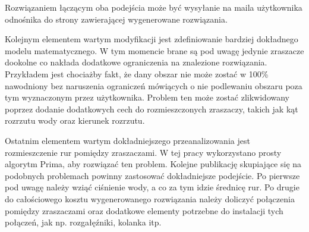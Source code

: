 \documentclass[twoside]{iisthesis}
\begin{document}
Rozwiązaniem łączącym oba podejścia może być wysyłanie na maila użytkownika odnośnika do strony zawierającej wygenerowane rozwiązania.

Kolejnym elementem wartym modyfikacji jest zdefiniowanie bardziej dokładnego modelu matematycznego. W tym momencie brane są pod uwagę jedynie zraszacze dookolne co nakłada dodatkowe ograniczenia na znalezione rozwiązania. Przykładem jest chociażby fakt, że dany obszar nie może zostać w 100\% nawodniony bez naruszenia ograniczeń mówiących o nie podlewaniu obszaru poza tym wyznaczonym przez użytkownika. Problem ten może zostać zlikwidowany poprzez dodanie dodatkowych cech do rozmieszczonych zraszaczy, takich jak kąt rozrzutu wody oraz kierunek rozrzutu.

Ostatnim elementem wartym dokładniejszego przeanalizowania jest rozmieszczenie rur pomiędzy zraszaczami. W tej pracy wykorzystano prosty algorytm Prima, aby rozwiązać ten problem. Kolejne publikację skupiające się na podobnych problemach powinny zastosować dokładniejsze podejście. Po pierwsze pod uwagę należy wziąć ciśnienie wody, a co za tym idzie średnicę rur. Po drugie do całościowego kosztu wygenerowanego rozwiązania należy doliczyć połączenia pomiędzy zraszaczami oraz dodatkowe elementy potrzebne do instalacji tych połączeń, jak np. rozgałęźniki, kolanka itp.



\end{document}
